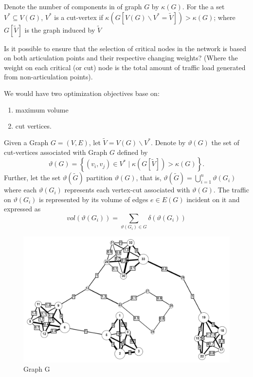 Denote the number of components in of graph $G$ by $\kappa(G)$. For the a set $V^* \subseteq V(G)$, $V^*$ is a cut-vertex
if $\kappa(G[V(G)\backslash V^* = \tilde{V} ]) > \kappa(G)$; where  $G[\tilde{V}]$ is the graph induced by $\tilde{V}$

\begin{question}
  \label{pythagorean}
  Is it possible to ensure that the selection of critical nodes in the network is based on both articulation points and their respective changing weights?
  (Where the weight on each critical (or cut) node is the total amount of traffic load generated from non-articulation points).
\end{question}

\begin{approach}
  We would have two optimization objectives base on:
  \begin{enumerate}
    \item maximum volume
    \item cut vertices.
  \end{enumerate}
\end{approach}


\begin{problem}
Given a Graph $G = (V, E)$, let $ \tilde{V} = V(G)\backslash V^*$. Denote by $\vartheta (G)$ the set of cut-vertices associated with Graph $G$ defined by
\begin{equation}
  \vartheta (G) =\left\{(v_i, v_j)\in V^* \; \vert \; \kappa(G[\tilde{V} ]) > \kappa(G)\right\}.
\end{equation}
Further, let the set $\vartheta (\tilde{G} )$ partition  $\vartheta (G)$, that is,
$\vartheta (\tilde{G}) = \bigcup_{i=1}^n \vartheta (G_i)$ where each  $\vartheta (G_i)$ represents each
vertex-cut associated with $\vartheta (G)$. The traffic on $\vartheta (G_i)$ is represented by its volume
of edges $e \in E(G)$
incident on it and expressed as
\begin{equation}
  vol(\vartheta (G_i)) = \sum_{\vartheta (G_i)\in G} \delta(\vartheta (G_i))
\end{equation}
\end{problem}%
\begin{figure}[htb!]
  \centering
  \includegraphics[width=\textwidth]{figures/full_graph.png}
  \caption{Graph G}
  \label{fig:full_graph}
\end{figure}%


